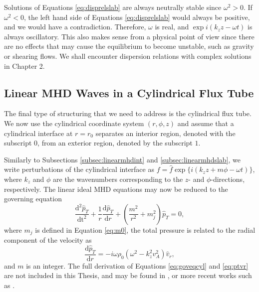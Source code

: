 Solutions of Equations \eqref{eq:disprelslab} are always neutrally stable since $\omega^2 > 0$.
If $\omega^2 < 0$, the left hand side of Equations \eqref{eq:disprelslab} would always be positive, and we would have a contradiction.
Therefore, $\omega$ is real, and $\exp{i(k_z z - \omega t)}$ is always oscillatory.
This also makes sense from a physical point of view since there are no effects that may cause the equilibrium to become unstable, such as gravity or shearing flows.
We shall encounter dispersion relations with complex solutions in Chapter 2.

\subsection{Linear MHD Waves in a Cylindrical Flux Tube}
\label{subsec:linearmhdcyl}

The final type of structuring that we need to address is the cylindrical flux tube.
We now use the cylindrical coordinate system $(r, \phi, z)$ and assume that a cylindrical interface at $r = r_0$ separates an interior region, denoted with the subscript $0$, from an exterior region, denoted by the subscript $1$.

Similarly to Subsections \ref{subsec:linearmhdint} and \ref{subsec:linearmhdslab}, we write perturbations of the cylindrical interface as $f = \hat{f} \exp\{i (k_z z + m \phi - \omega t)\}$, where $k_z$ and $\phi$ are the wavenumbers corresponding to the $z$- and $\phi$-directions, respectively.
The linear ideal MHD equations may now be reduced to the governing equation
%
\begin{equation}
\label{eq:goveqcyl}
\frac{\mathrm{d}^2 \hat p_T}{\mathrm{\mathrm{d} t^2}}
+ \frac{1}{r} \frac{\mathrm{d} \hat p_T}{\mathrm{d} r}
+ \left( \frac{m^2}{r^2} + m_j^2 \right) \hat p_T = 0,
\end{equation}
%
where $m_j$ is defined in Equation \eqref{eq:m0}, the total pressure is related to the radial component of the velocity as
%
\begin{equation}
\label{eq:ptvr}
\frac{\mathrm{d} \hat p_T}{\mathrm{d} r} = - i \omega \rho_0 (\omega^2 - k_z^2 v_A^2) \hat v_r,
\end{equation}
%
and $m$ is an integer.
The full derivation of Equations \eqref{eq:goveqcyl} and \eqref{eq:ptvr} are not included in this Thesis, and may be found in \cite{Edwin1983}, or more recent works such as \cite{Goedbloed2004, Priest2014}.

